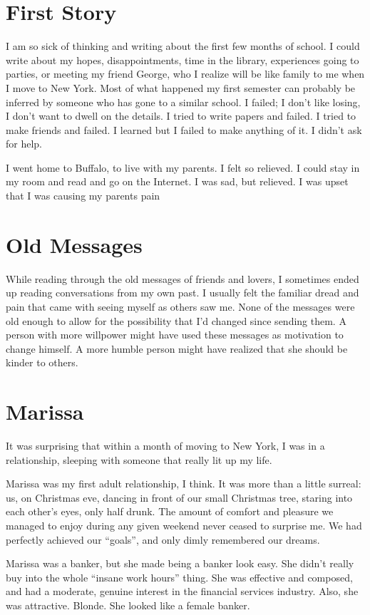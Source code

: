 \documentclass[12pt]{article}
\begin{document}
\section{First Story}
I am so sick of thinking and writing about the first few months of school.  I
could write about my hopes, disappointments, time in the library, experiences
going to parties, or meeting my friend George, who I realize will be like family
to me when I move to New York.  Most of what happened my first semester can
probably be inferred by someone who has gone to a similar school.  I failed; I
don't like losing, I don't want to dwell on the details.  I tried to write
papers and failed.  I tried to make friends and failed.  I learned but I failed
to make anything of it.  I didn't ask for help.

I went home to Buffalo, to live with my parents.  I felt so relieved.  I could
stay in my room and read and go on the Internet.  I was sad, but relieved.  I
was upset that I was causing my parents pain

\section{Old Messages}
While reading through the old messages of friends and lovers, I
sometimes ended up reading conversations from my own past.  I usually
felt the familiar dread and pain that came  with seeing myself as others
saw me.  None of the messages were old enough to allow for the
possibility that I'd changed since sending them.  A person with more
willpower might have used these messages as motivation to
change himself.  A more humble person might have realized that she
should be kinder to others.

\section{Marissa}
It was surprising that within a month of moving to New York, I was
in a relationship, sleeping with someone that really lit up my life.

Marissa was my first adult relationship, I think.  It was more than a
little surreal: us, on Christmas eve, dancing in front of our small
Christmas tree, staring into each other's eyes, only half drunk.  The
amount of comfort and pleasure we managed to enjoy during any given weekend
never ceased to surprise me.  We had perfectly
achieved our ``goals'', and only dimly remembered our dreams.

Marissa was a banker, but she made being a banker look easy.  She didn't really
buy into the whole ``insane work hours'' thing.  She was effective and composed,
and had a moderate, genuine interest in the financial services industry.  Also,
she was attractive.  Blonde.  She looked like a female banker. 
\end{document}
